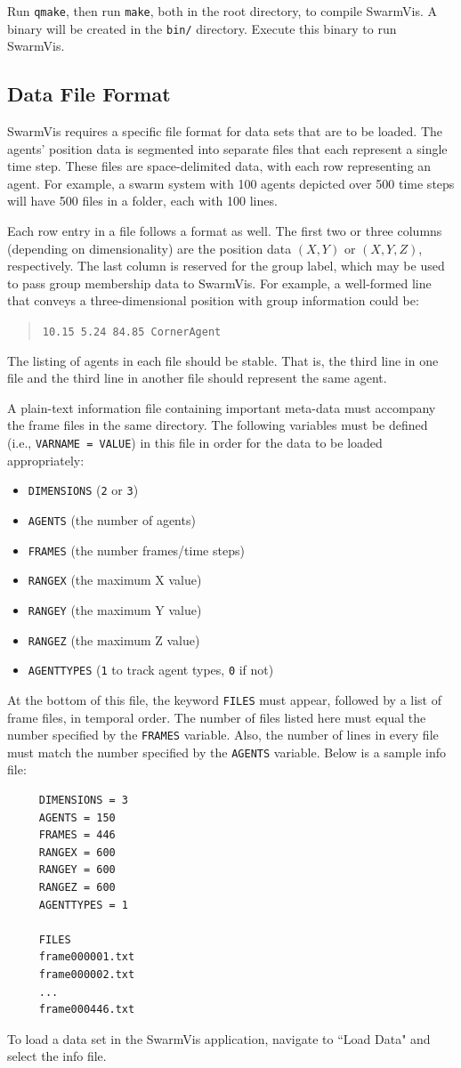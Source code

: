 \documentclass[conference]{IEEEtran}
\begin{document}
Run \texttt{qmake}, then run \texttt{make}, both in the root directory, to compile SwarmVis.
A binary will be created in the \texttt{bin/} directory. Execute this binary to run SwarmVis.

\subsection{Data File Format}
SwarmVis requires a specific file format for data sets that are to be loaded. The agents' position data is segmented into
separate files that each represent a single time step. These files are space-delimited data, with
each row representing an agent. For example, a swarm system with 100 agents depicted over 500 time steps
will have 500 files in a folder, each with 100 lines.

Each row entry in a file follows a format as well. The first two or three  columns (depending on dimensionality) are the
position data $(X, Y)$ or $(X, Y, Z)$, respectively. The last column is reserved for the group label, which may be used to pass
group membership data to SwarmVis.
For example, a well-formed line that conveys a three-dimensional
position with group information could be:
\begin{quote}
\texttt{10.15 5.24 84.85 CornerAgent}
\end{quote}
The listing of agents in each file should be stable. That is, the third line in one file and the third line in another file
should represent the same agent.

A plain-text information file containing important meta-data must accompany the frame files in the same directory.
The following variables must be defined (i.e., \texttt{VARNAME = VALUE}) in this file in order for the data to be loaded appropriately:
\begin{itemize}
\item \texttt{DIMENSIONS} (\texttt{2} or \texttt{3})
\item \texttt{AGENTS} (the number of agents)
\item \texttt{FRAMES} (the number frames/time steps)
\item \texttt{RANGEX} (the maximum X value)
\item \texttt{RANGEY} (the maximum Y value)
\item \texttt{RANGEZ} (the maximum Z value)
\item \texttt{AGENTTYPES} (\texttt{1} to track agent types, \texttt{0} if not)
\end{itemize}
At the bottom of this file, the keyword \texttt{FILES} must appear, followed by a list of frame files, in temporal order. The number
of files listed here must equal the number specified by the \texttt{FRAMES} variable. Also,
the number of lines in every file must match the number specified by the \texttt{AGENTS} variable. Below is a sample info file:
\begin{verbatim}
     DIMENSIONS = 3
     AGENTS = 150
     FRAMES = 446
     RANGEX = 600
     RANGEY = 600
     RANGEZ = 600
     AGENTTYPES = 1

     FILES
     frame000001.txt
     frame000002.txt
     ...
     frame000446.txt
\end{verbatim}

To load a data set in the SwarmVis application, navigate to ``Load Data" and select the info file.
\end{document}
